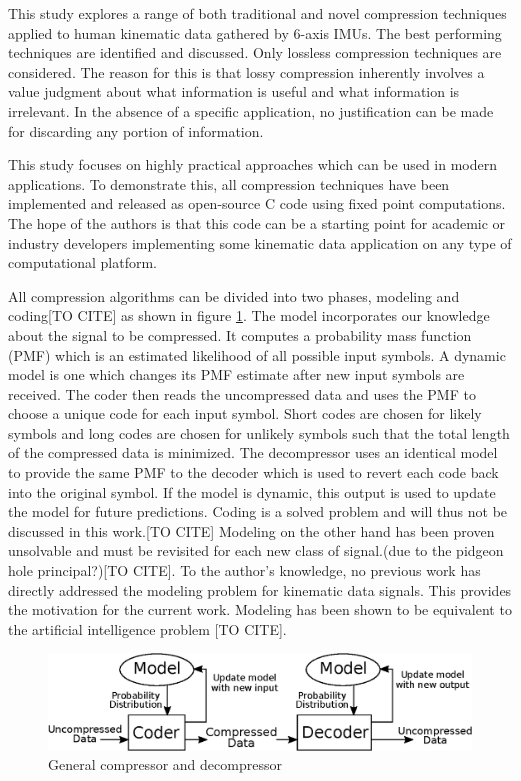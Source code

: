 \documentclass[journal]{IEEEtran}
\begin{document}
This study explores a range of both traditional and novel compression techniques applied to human kinematic data gathered by 6-axis IMUs. The best performing techniques are identified and discussed. Only lossless compression techniques are considered. The reason for this is that lossy compression inherently involves a value judgment about what information is useful and what information is irrelevant. In the absence of a specific application, no justification can be made for discarding any portion of information.

This study focuses on highly practical approaches which can be used in modern applications. To demonstrate this, all compression techniques have been implemented and released as open-source C code using fixed point computations. The hope of the authors is that this code can be a starting point for academic or industry developers implementing some kinematic data application on any type of computational platform.

All compression algorithms can be divided into two phases, modeling and coding[TO CITE] as shown in figure \ref{fig:general_compressor}. The model incorporates our knowledge about the signal to be compressed. It computes a probability mass function (PMF) which is an estimated likelihood of all possible input symbols. A dynamic model is one which changes its PMF estimate after new input symbols are received. The coder then reads the uncompressed data and uses the PMF to choose a unique code for each input symbol. Short codes are chosen for likely symbols and long codes are chosen for unlikely symbols such that the total length of the compressed data is minimized. The decompressor uses an identical model to provide the same PMF to the decoder which is used to revert each code back into the original symbol. If the model is dynamic, this output is used to update the model for future predictions. Coding is a solved problem and will thus not be discussed in this work.[TO CITE] Modeling on the other hand has been proven unsolvable and must be revisited for each new class of signal.(due to the pidgeon hole principal?)[TO CITE]. To the author's knowledge, no previous work has directly addressed the modeling problem for kinematic data signals. This provides the motivation for the current work. Modeling has been shown to be equivalent to the artificial intelligence problem [TO CITE].

\begin{figure}
  \includegraphics[width=\linewidth]{general_compressor.eps}
  \caption{General compressor and decompressor}
  \label{fig:general_compressor}
\end{figure}
\end{document}
